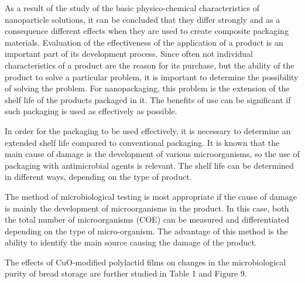 \begin{multicols}{2}
As a result of the study of the basic physico-chemical characteristics
of nanoparticle solutions, it can be concluded that they differ strongly
and as a consequence different effects when they are used to create
composite packaging materials. Evaluation of the effectiveness of the
application of a product is an important part of its development
process. Since often not individual characteristics of a product are the
reason for its purchase, but the ability of the product to solve a
particular problem, it is important to determine the possibility of
solving the problem. For nanopackaging, this problem is the extension of
the shelf life of the products packaged in it. The benefits of use can
be significant if such packaging is used as effectively as possible.

In order for the packaging to be used effectively, it is necessary to
determine an extended shelf life compared to conventional packaging. It
is known that the main cause of damage is the development of various
microorganisms, so the use of packaging with antimicrobial agents is
relevant. The shelf life can be determined in different ways, depending
on the type of product.

The method of microbiological testing is most appropriate if the cause
of damage is mainly the development of microorganisms in the product. In
this case, both the total number of microorganisms (COE) can be measured
and differentiated depending on the type of micro-organism. The
advantage of this method is the ability to identify the main source
causing the damage of the product.

The effects of CuO-modified polylactid films on changes in the
microbiological purity of bread storage are further studied in Table 1
and Figure 9.
\end{multicols}

